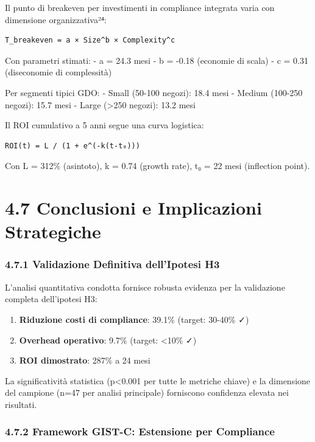 \documentclass{report}
\providecommand{\tightlist}{%
  \setlength{\itemsep}{0pt}\setlength{\parskip}{0pt}
}
\begin{document}
Il punto di breakeven per investimenti in compliance integrata varia con
dimensione organizzativa²⁴:

\begin{verbatim}
T_breakeven = a × Size^b × Complexity^c
\end{verbatim}

Con parametri stimati: - a = 24.3 mesi - b = -0.18 (economie di scala) -
c = 0.31 (diseconomie di complessità)

Per segmenti tipici GDO: - Small (50-100 negozi): 18.4 mesi - Medium
(100-250 negozi): 15.7 mesi - Large (\textgreater250 negozi): 13.2 mesi

Il ROI cumulativo a 5 anni segue una curva logistica:

\begin{verbatim}
ROI(t) = L / (1 + e^(-k(t-t₀)))
\end{verbatim}

Con L = 312\% (asintoto), k = 0.74 (growth rate), t₀ = 22 mesi
(inflection point).

\section{4.7 Conclusioni e Implicazioni
Strategiche}\label{conclusioni-e-implicazioni-strategiche}

\subsubsection{4.7.1 Validazione Definitiva dell'Ipotesi
H3}\label{validazione-definitiva-dellipotesi-h3}

L'analisi quantitativa condotta fornisce robusta evidenza per la
validazione completa dell'ipotesi H3:

\begin{enumerate}
\def\labelenumi{\arabic{enumi}.}
\tightlist
\item
  \textbf{Riduzione costi di compliance}: 39.1\% (target: 30-40\% ✓)
\item
  \textbf{Overhead operativo}: 9.7\% (target: \textless10\% ✓)
\item
  \textbf{ROI dimostrato}: 287\% a 24 mesi
\end{enumerate}

La significatività statistica (p\textless0.001 per tutte le metriche
chiave) e la dimensione del campione (n=47 per analisi principale)
forniscono confidenza elevata nei risultati.

\subsubsection{4.7.2 Framework GIST-C: Estensione per
Compliance}\label{framework-gist-c-estensione-per-compliance}
\end{document}
